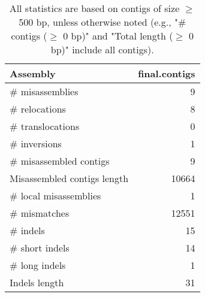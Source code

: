 \documentclass[12pt,a4paper]{article}
\begin{document}
\begin{table}[ht]
\begin{center}
\caption{All statistics are based on contigs of size $\geq$ 500 bp, unless otherwise noted (e.g., "\# contigs ($\geq$ 0 bp)" and "Total length ($\geq$ 0 bp)" include all contigs).}
\begin{tabular}{|l*{1}{|r}|}
\hline
Assembly & final.contigs \\ \hline
\# misassemblies & 9 \\ \hline
\hspace{5mm}\# relocations & 8 \\ \hline
\hspace{5mm}\# translocations & 0 \\ \hline
\hspace{5mm}\# inversions & 1 \\ \hline
\# misassembled contigs & 9 \\ \hline
Misassembled contigs length & 10664 \\ \hline
\# local misassemblies & 1 \\ \hline
\# mismatches & 12551 \\ \hline
\# indels & 15 \\ \hline
\hspace{5mm}\# short indels & 14 \\ \hline
\hspace{5mm}\# long indels & 1 \\ \hline
Indels length & 31 \\ \hline
\end{tabular}
\end{center}
\end{table}
\end{document}
